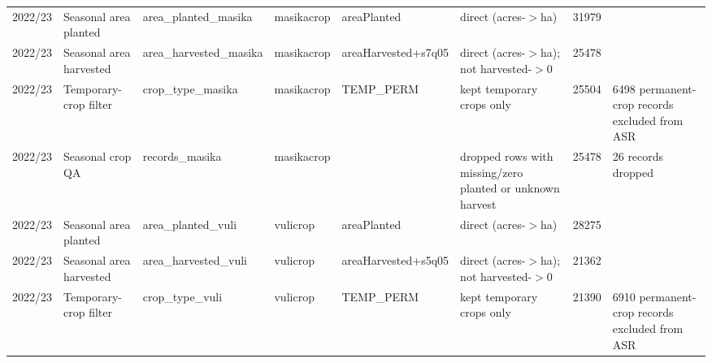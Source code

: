 \begin{tabular}{llllllrl}
 2022/23         & Seasonal area planted     & area\_planted\_masika       & masikacrop                       & areaPlanted                               & direct (acres-\ensuremath{>}ha)                                                                                           &   31979 &                                                                                                \\
 2022/23         & Seasonal area harvested   & area\_harvested\_masika     & masikacrop                       & areaHarvested+s7q05                       & direct (acres-\ensuremath{>}ha); not harvested-\ensuremath{>}0                                                                         &   25478 &                                                                                                \\
 2022/23         & Temporary-crop filter     & crop\_type\_masika          & masikacrop                       & TEMP\_PERM                                 & kept temporary crops only                                                                                    &   25504 & 6498 permanent-crop records excluded from ASR                                                  \\
 2022/23         & Seasonal crop QA          & records\_masika            & masikacrop                       &                                           & dropped rows with missing/zero planted or unknown harvest                                                    &   25478 & 26 records dropped                                                                             \\
 2022/23         & Seasonal area planted     & area\_planted\_vuli         & vulicrop                         & areaPlanted                               & direct (acres-\ensuremath{>}ha)                                                                                           &   28275 &                                                                                                \\
 2022/23         & Seasonal area harvested   & area\_harvested\_vuli       & vulicrop                         & areaHarvested+s5q05                       & direct (acres-\ensuremath{>}ha); not harvested-\ensuremath{>}0                                                                         &   21362 &                                                                                                \\
 2022/23         & Temporary-crop filter     & crop\_type\_vuli            & vulicrop                         & TEMP\_PERM                                 & kept temporary crops only                                                                                    &   21390 & 6910 permanent-crop records excluded from ASR                                                  \\

\end{tabular}
